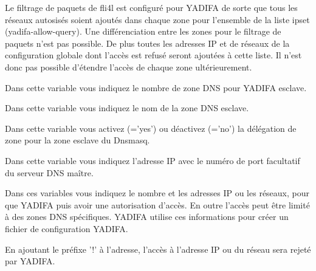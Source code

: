 \begin{description}
    Le filtrage de paquets de fli4l est configuré pour YADIFA de sorte que tous
    les réseaux autosisés soient ajoutés dans chaque zone pour l'ensemble de la
    liste ipset (yadifa-allow-query). Une différenciation entre les zones pour
    le filtrage de paquets n'est pas possible. De plus toutes les adresses IP
    et de réseaux de la configuration globale dont l'accès est refusé seront
    ajoutées à cette liste. Il n'est donc pas possible d'étendre l'accès de
    chaque zone ultérieurement.


    Dans cette variable vous indiquez le nombre de zone DNS pour YADIFA esclave.


    Dans cette variable vous indiquez le nom de la zone DNS esclave.


    Dans cette variable vous activez (='yes') ou déactivez (='no')
    la délégation de zone pour la zone esclave du Dnsmasq.


    Dans cette variable vous indiquez l'adresse IP avec le numéro de port
    facultatif du serveur DNS maître.


    Dans ces variables vous indiquez le nombre et les adresses IP ou
    les réseaux, pour que YADIFA puis avoir une autorisation d'accès. En outre
    l'accès peut être limité à des zones DNS spécifiques. YADIFA utilise ces
    informations pour créer un fichier de configuration YADIFA.

    En ajoutant le préfixe '!' à l'adresse, l'accès à l'adresse IP ou du réseau
    sera rejeté par YADIFA.

\end{description}
